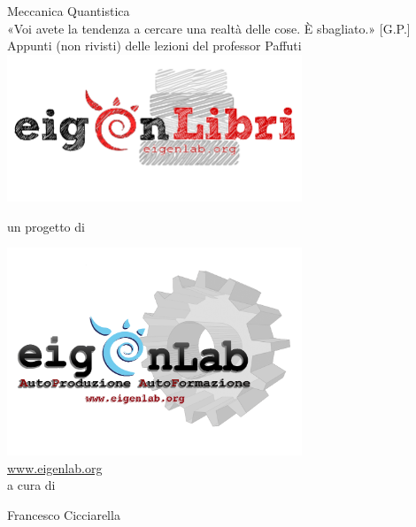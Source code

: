 \documentclass[12pt,a4paper]{report}
\theoremstyle{definition}
\numberwithin{equation}{section}
\begin{document}
\begin{titlepage}
\centering
{\Huge Meccanica Quantistica}\\
\vspace*{0.5cm}
{\normalsize «Voi avete la tendenza a cercare una realtà delle cose. È sbagliato.» [G.P.]} \\
\vspace*{0.5cm}
{\small Appunti (non rivisti) delle lezioni del professor Paffuti}
 \\
\includegraphics[width=250pt,keepaspectratio=true]{Addons/eigenLibrichiaro}
\begin{center}
un progetto di
\end{center}
\includegraphics[width=250pt,keepaspectratio=true]{Addons/eigenlabinvertito2.png} \\
\url{www.eigenlab.org}
 \\
{\small a cura di}\\
\vspace*{0.5cm}
{\normalsize Francesco Cicciarella\par}
\end{titlepage}
\pagebreak
\end{document}
